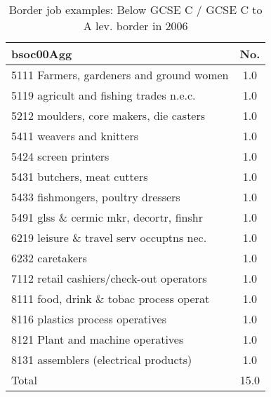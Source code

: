 \begin{table}[h!]
	\centering
	\caption{Border job examples: Below GCSE C / GCSE C to A lev. border in 2006}
	\label{tab:357212}
	\begin{tabular}{lc}
	\toprule
bsoc00Agg&No. \\
\hline
5111 Farmers, gardeners and ground women&1.0 \\
5119 agricult and fishing trades n.e.c.&1.0 \\
5212 moulders, core makers, die casters&1.0 \\
5411 weavers and knitters&1.0 \\
5424 screen printers&1.0 \\
5431 butchers, meat cutters&1.0 \\
5433 fishmongers, poultry dressers&1.0 \\
5491 glss \& cermic mkr, decortr, finshr&1.0 \\
6219 leisure \& travel serv occuptns nec.&1.0 \\
6232 caretakers&1.0 \\
7112 retail cashiers/check-out operators&1.0 \\
8111 food, drink \& tobac process operat&1.0 \\
8116 plastics process operatives&1.0 \\
8121 Plant and machine operatives&1.0 \\
8131 assemblers (electrical products)&1.0 \\
Total&15.0 \\
\bottomrule
\bottomrule
\end{tabular}
\end{table}
